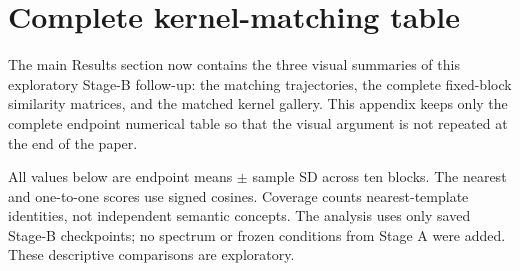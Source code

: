 \section{Complete kernel-matching table}\label{app:kernel-matching}

The main Results section now contains the three visual summaries of this exploratory Stage-B follow-up: the matching trajectories, the complete fixed-block similarity matrices, and the matched kernel gallery. This appendix keeps only the complete endpoint numerical table so that the visual argument is not repeated at the end of the paper.

All values below are endpoint means $\pm$ sample SD across ten blocks. The nearest and one-to-one scores use signed cosines. Coverage counts nearest-template identities, not independent semantic concepts. The analysis uses only saved Stage-B checkpoints; no spectrum or frozen conditions from Stage A were added. These descriptive comparisons are exploratory.

